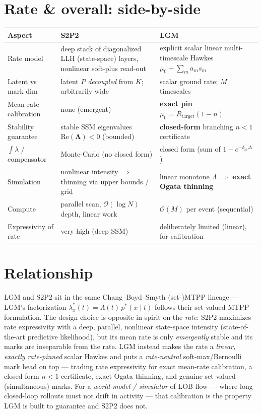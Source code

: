 \documentclass[11pt]{article}
\newcommand{\Lam}{\Lambda}
\begin{document}
\section{Rate \& overall: side-by-side}
\renewcommand{\arraystretch}{1.3}
\begin{center}\small
\begin{tabular}{>{\raggedright\arraybackslash}p{3.0cm} >{\raggedright\arraybackslash}p{5.8cm} >{\raggedright\arraybackslash}p{5.8cm}}
\toprule
\textbf{Aspect} & \textbf{S2P2} & \textbf{LGM}\\
\midrule
Rate model & deep stack of diagonalized LLH (state-space) layers, nonlinear soft-plus read-out & explicit scalar linear multi-timescale Hawkes $\mu_0+\sum_m a_m s_m$\\
Latent vs mark dim & latent $P$ \emph{decoupled} from $K$; arbitrarily wide & scalar ground rate; $M$ timescales\\
Mean-rate calibration & none (emergent) & \textbf{exact pin} $\mu_0=R_{\mathrm{target}}(1-n)$\\
Stability guarantee & stable SSM eigenvalues $\mathrm{Re}(\boldsymbol\Lambda)<0$ (bounded) & \textbf{closed-form} branching $n<1$ certificate\\
$\int\lambda$ / compensator & Monte-Carlo (no closed form) & closed form (sum of $1-e^{-\delta_m\Delta}$)\\
Simulation & nonlinear intensity $\Rightarrow$ thinning via upper bounds / grid & linear monotone $\Lam$ $\Rightarrow$ \textbf{exact Ogata thinning}\\
Compute & parallel scan, $\mathcal{O}(\log N)$ depth, linear work & $\mathcal{O}(M)$ per event (sequential)\\
Expressivity of rate & very high (deep SSM) & deliberately limited (linear), for calibration\\
\bottomrule
\end{tabular}
\end{center}

\section{Relationship}
LGM and S2P2 sit in the same Chang--Boyd--Smyth (set-)MTPP lineage --- LGM's factorization
$\lambda_x^*(t)=\Lam(t)\,p^*(x\mid t)$ follows their set-valued MTPP formulation. The design choice is
opposite in spirit on the \emph{rate}: S2P2 maximizes rate expressivity with a deep, parallel,
nonlinear state-space intensity (state-of-the-art predictive likelihood), but its mean rate is only
\emph{emergently} stable and its marks are inseparable from the rate. LGM instead makes the rate a
\emph{linear, exactly rate-pinned} scalar Hawkes and puts a \emph{rate-neutral} soft-max/Bernoulli
mark head on top --- trading rate expressivity for exact mean-rate calibration, a closed-form
$n<1$ certificate, exact Ogata thinning, and genuine set-valued (simultaneous) marks. For a
\emph{world-model / simulator} of LOB flow --- where long closed-loop rollouts must not drift in
activity --- that calibration is the property LGM is built to guarantee and S2P2 does not.
\end{document}
